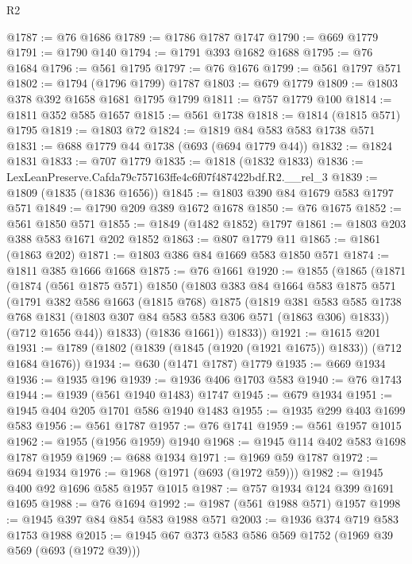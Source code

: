 \begin{lexlean}{R2}
\begin{coremodule}
@1787 := @76 @1686
@1789 := @1786 @1787 @1747
@1790 := @669 @1779
@1791 := @1790 @140
@1794 := @1791 @393 @1682 @1688
@1795 := @76 @1684
@1796 := @561 @1795
@1797 := @76 @1676
@1799 := @561 @1797 @571
@1802 := @1794 (@1796 @1799) @1787
@1803 := @679 @1779
@1809 := @1803 @378 @392 @1658 @1681 @1795 @1799
@1811 := @757 @1779 @100
@1814 := @1811 @352 @585 @1657
@1815 := @561 @1738
@1818 := @1814 (@1815 @571) @1795
@1819 := @1803 @72
@1824 := @1819 @84 @583 @583 @1738 @571
@1831 := @688 @1779 @44 @1738 (@693 (@694 @1779 @44))
@1832 := @1824 @1831
@1833 := @707 @1779
@1835 := @1818 (@1832 @1833)
@1836 := LexLeanPreserve.Cafda79c757163ffe4c6f07f487422bdf.R2.__rel_3
@1839 := @1809 (@1835 (@1836 @1656))
@1845 := @1803 @390 @84 @1679 @583 @1797 @571
@1849 := @1790 @209 @389 @1672 @1678
@1850 := @76 @1675
@1852 := @561 @1850 @571
@1855 := @1849 (@1482 @1852) @1797
@1861 := @1803 @203 @388 @583 @1671 @202 @1852
@1863 := @807 @1779 @11
@1865 := @1861 (@1863 @202)
@1871 := @1803 @386 @84 @1669 @583 @1850 @571
@1874 := @1811 @385 @1666 @1668
@1875 := @76 @1661
@1920 := @1855
    (@1865
      (@1871
        (@1874
          (@561 @1875 @571)
          @1850
          (@1803
            @383
            @84
            @1664
            @583
            @1875
            @571
            (@1791
              @382
              @586
              @1663
              (@1815 @768)
              @1875
              (@1819
                @381
                @583
                @585
                @1738
                @768
                @1831
                (@1803 @307 @84 @583 @583 @306 @571 (@1863 @306) @1833))
              (@712 @1656 @44))
            @1833)
          (@1836 @1661))
        @1833))
@1921 := @1615 @201
@1931 := @1789 (@1802 (@1839 (@1845 (@1920 (@1921 @1675)) @1833)) (@712 @1684 @1676))
@1934 := @630 (@1471 @1787) @1779
@1935 := @669 @1934
@1936 := @1935 @196
@1939 := @1936 @406 @1703 @583
@1940 := @76 @1743
@1944 := @1939 (@561 @1940 @1483) @1747
@1945 := @679 @1934
@1951 := @1945 @404 @205 @1701 @586 @1940 @1483
@1955 := @1935 @299 @403 @1699 @583
@1956 := @561 @1787
@1957 := @76 @1741
@1959 := @561 @1957 @1015
@1962 := @1955 (@1956 @1959) @1940
@1968 := @1945 @114 @402 @583 @1698 @1787 @1959
@1969 := @688 @1934
@1971 := @1969 @59 @1787
@1972 := @694 @1934
@1976 := @1968 (@1971 (@693 (@1972 @59)))
@1982 := @1945 @400 @92 @1696 @585 @1957 @1015
@1987 := @757 @1934 @124 @399 @1691 @1695
@1988 := @76 @1694
@1992 := @1987 (@561 @1988 @571) @1957
@1998 := @1945 @397 @84 @854 @583 @1988 @571
@2003 := @1936 @374 @719 @583 @1753 @1988
@2015 := @1945 @67 @373 @583 @586 @569 @1752 (@1969 @39 @569 (@693 (@1972 @39)))

\end{coremodule}
\end{lexlean}
